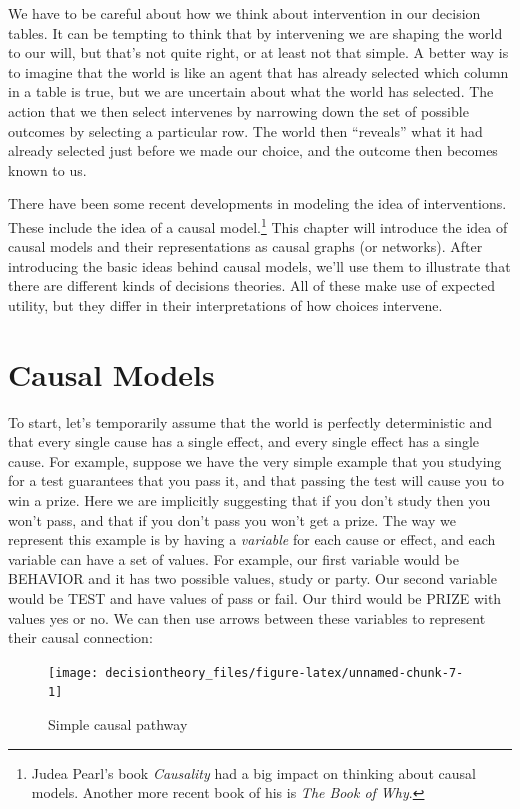 \documentclass[]{tufte-book}
\begin{document}
We have to be careful about how we think about intervention in our decision tables. It can be tempting to think that by intervening we are shaping the world to our will, but that's not quite right, or at least not that simple. A better way is to imagine that the world is like an agent that has already selected which column in a table is true, but we are uncertain about what the world has selected. The action that we then select intervenes by narrowing down the set of possible outcomes by selecting a particular row. The world then ``reveals'' what it had already selected just before we made our choice, and the outcome then becomes known to us.

There have been some recent developments in modeling the idea of interventions. These include the idea of a causal model.\footnote{Judea Pearl's book \emph{Causality} had a big impact on thinking about causal models. Another more recent book of his is \emph{The Book of Why}.} This chapter will introduce the idea of causal models and their representations as causal graphs (or networks). After introducing the basic ideas behind causal models, we'll use them to illustrate that there are different kinds of decisions theories. All of these make use of expected utility, but they differ in their interpretations of how choices intervene.

\hypertarget{causal-models}{%
\section{Causal Models}\label{causal-models}}

To start, let's temporarily assume that the world is perfectly deterministic and that every single cause has a single effect, and every single effect has a single cause. For example, suppose we have the very simple example that you studying for a test guarantees that you pass it, and that passing the test will cause you to win a prize. Here we are implicitly suggesting that if you don't study then you won't pass, and that if you don't pass you won't get a prize. The way we represent this example is by having a \emph{variable} for each cause or effect, and each variable can have a set of values. For example, our first variable would be BEHAVIOR and it has two possible values, study or party. Our second variable would be TEST and have values of pass or fail. Our third would be PRIZE with values yes or no. We can then use arrows between these variables to represent their causal connection:

\begin{figure}
\texttt{[image: decisiontheory\_files/figure-latex/unnamed-chunk-7-1]} \caption[Simple causal pathway]{Simple causal pathway}\label{fig:unnamed-chunk-7}
\end{figure}
\end{document}
